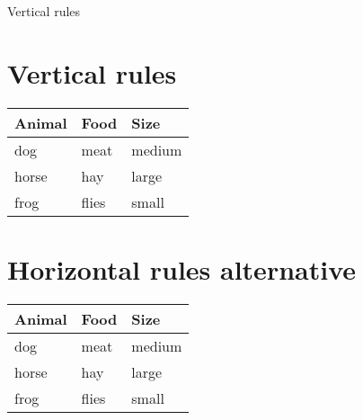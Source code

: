 \documentclass{article}
\begin{document}
Vertical rules

\section{Vertical rules}
\begin{tabular}{|l|ll}
    \toprule
    Animal  & Food  & Size      \\
    \midrule
    dog     & meat  & medium    \\
    \cmidrule{1-1}
    horse   & hay   & large     \\
    frog    & flies & small     \\
    \bottomrule
\end{tabular}

\section{Horizontal rules alternative}
\begin{tabular}{|l|l|l|}
    \hline
    Animal  & Food  & Size      \\
    \hline
    dog     & meat  & medium    \\
    \cline{1-1}
    horse   & hay   & large     \\
    frog    & flies & small     \\
    \hline
\end{tabular}
\end{document}
